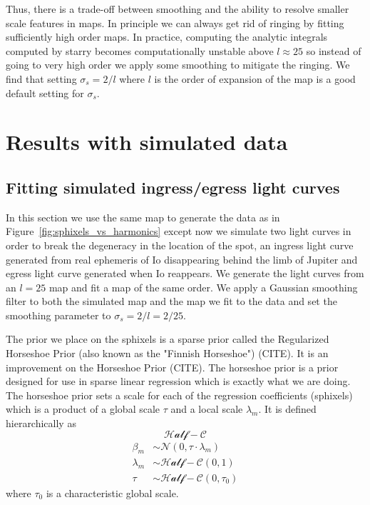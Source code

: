 \documentclass[modern]{aastex62}
\begin{document}
Thus, there is a trade-off between smoothing and the ability to resolve smaller scale features
in maps. 
In principle we can always get rid of ringing by fitting sufficiently high order maps.
In practice, computing the analytic integrals computed by \textsf{starry} becomes computationally unstable above $l\approx 25$ so instead of going to very high order we apply some smoothing to mitigate the ringing.
We find that setting $\sigma_s=2/l$ where $l$ is the order of expansion of the map  is a good default setting for $\sigma_s$.

\section{Results with simulated data}
\label{sec:results_sim}
\subsection{Fitting simulated ingress/egress light curves}
In this section we use the same map to generate the data as in Figure~\ref{fig:sphixels_vs_harmonics} except now we simulate two light curves in order to break the degeneracy in the location of the spot, an ingress light curve generated from real ephemeris of Io disappearing behind the limb of Jupiter and egress light curve generated when Io reappears.
We generate the light curves from an $l=25$ map and fit a map of the same order. 
We apply a Gaussian smoothing filter to both the simulated map and the map we fit to the data and set the smoothing parameter to $\sigma_s=2/l=2/25$.

The prior we place on the sphixels is a sparse prior called the Regularized Horseshoe Prior (also known as the "Finnish Horseshoe") (CITE). 
It is an improvement on the Horseshoe Prior (CITE).
The horseshoe prior is a prior designed for use in sparse linear regression which is exactly what we are doing.
The horseshoe prior sets a scale for each of the regression coefficients (sphixels) which is a product of a global scale $\tau$ and a local scale $\lambda_m$.
It is defined hierarchically as 
\begin{equation}
\mathcal{Half}-\mathcal{C} 
\end{equation}
\begin{equation}
\begin{aligned}
\beta_{m} & \sim \mathcal{N}\left(0, \tau \cdot \lambda_{m}\right) \\
    \lambda_{m} & \sim \mathcal{Half}-\mathcal{C} (0,1) \\
    \tau & \sim \mathcal{Half-C} \left(0, \tau_{0}\right)
\end{aligned}
\end{equation}
where $\tau_0$ is a characteristic global scale.
\end{document}
